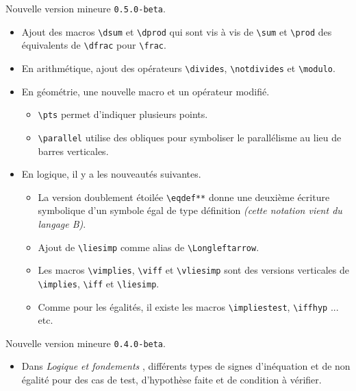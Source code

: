 \documentclass[12pt,a4paper]{article}
\theoremstyle{definition}
\begin{document}
\begin{description}[leftmargin=1em]

    \item[2019-09-27] Nouvelle version mineure \verb+0.5.0-beta+.
    \begin{itemize}
        \item Ajout des macros \verb+\dsum+ et \verb+\dprod+ qui sont vis à vis de \verb+\sum+ et \verb+\prod+ des équivalents de \verb+\dfrac+ pour \verb+\frac+.

        \item En arithmétique, ajout des opérateurs \verb+\divides+, \verb+\notdivides+ et \verb+\modulo+.

        \item En géométrie, une nouvelle macro et un opérateur modifié.
        \begin{itemize}
            \item \verb+\pts+ permet d'indiquer plusieurs points.

            \item \verb+\parallel+ utilise des obliques pour symboliser le parallélisme au lieu de barres verticales.
        \end{itemize}

        \item En logique, il y a les nouveautés suivantes.
        \begin{itemize}
            \item La version doublement étoilée \verb+\eqdef**+ donne une deuxième écriture symbolique d'un symbole égal de type définition \emph{(cette notation vient du langage B)}.

            \item Ajout de \verb+\liesimp+ comme alias de \verb+\Longleftarrow+.

            \item Les macros \verb+\vimplies+, \verb+\viff+ et \verb+\vliesimp+ sont des versions verticales de \verb+\implies+, \verb+\iff+ et \verb+\liesimp+.

            \item Comme pour les égalités, il existe les macros \verb+\impliestest+, \verb+\iffhyp+ ... etc.
        \end{itemize}
    \end{itemize}


    \item[2019-09-06]  Nouvelle version mineure \verb+0.4.0-beta+.
    \begin{itemize}
        \item Dans \emph{\og Logique et fondements \fg}, différents types de signes d'inéquation et de non égalité pour des cas de test, d'hypothèse faite et de condition à vérifier.


\end{itemize}
\end{description}
\end{document}
